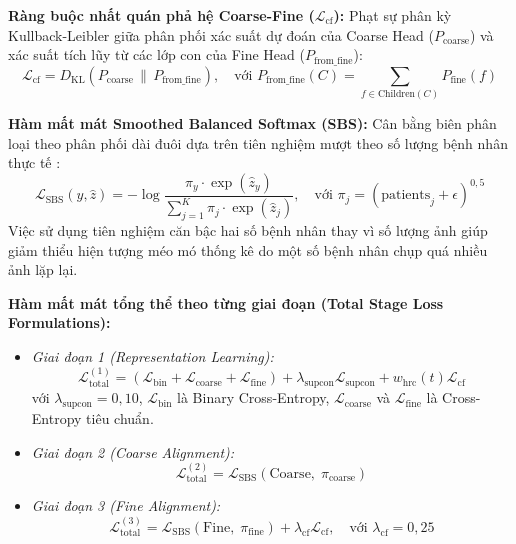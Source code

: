 \documentclass[runningheads]{llncs}
\begin{document}
\noindent \textbf{Ràng buộc nhất quán phả hệ Coarse-Fine ($\mathcal{L}_{\text{cf}}$):} Phạt sự phân kỳ Kullback-Leibler giữa phân phối xác suất dự đoán của Coarse Head ($P_{\text{coarse}}$) và xác suất tích lũy từ các lớp con của Fine Head ($P_{\text{from\_fine}}$):
\begin{equation}
\mathcal{L}_{\text{cf}} = D_{\text{KL}}\left(P_{\text{coarse}} \,\parallel\, P_{\text{from\_fine}}\right), \quad \text{với } P_{\text{from\_fine}}(C) = \sum_{f \in \text{Children}(C)} P_{\text{fine}}(f)
\end{equation}

\noindent \textbf{Hàm mất mát Smoothed Balanced Softmax (SBS):} Cân bằng biên phân loại theo phân phối dài đuôi dựa trên tiên nghiệm mượt theo số lượng bệnh nhân thực tế \cite{ref_ren2020balanced}:
\begin{equation}
\mathcal{L}_{\text{SBS}}(y, \hat{z}) = -\log \frac{\pi_y \cdot \exp(\hat{z}_y)}{\sum_{j=1}^{K} \pi_j \cdot \exp(\hat{z}_j)}, \quad \text{với } \pi_j = (\text{patients}_j + \epsilon)^{0{,}5}
\end{equation}
Việc sử dụng tiên nghiệm căn bậc hai số bệnh nhân thay vì số lượng ảnh giúp giảm thiểu hiện tượng méo mó thống kê do một số bệnh nhân chụp quá nhiều ảnh lặp lại.

\noindent \textbf{Hàm mất mát tổng thể theo từng giai đoạn (Total Stage Loss Formulations):}
\begin{itemize}
    \item \textit{Giai đoạn 1 (Representation Learning):}
    \begin{equation}
    \mathcal{L}_{\text{total}}^{(1)} = \left(\mathcal{L}_{\text{bin}} + \mathcal{L}_{\text{coarse}} + \mathcal{L}_{\text{fine}}\right) + \lambda_{\text{supcon}} \mathcal{L}_{\text{supcon}} + w_{\text{hrc}}(t) \mathcal{L}_{\text{cf}}
    \end{equation}
    với $\lambda_{\text{supcon}} = 0{,}10$, $\mathcal{L}_{\text{bin}}$ là Binary Cross-Entropy, $\mathcal{L}_{\text{coarse}}$ và $\mathcal{L}_{\text{fine}}$ là Cross-Entropy tiêu chuẩn.
    \item \textit{Giai đoạn 2 (Coarse Alignment):}
    \begin{equation}
    \mathcal{L}_{\text{total}}^{(2)} = \mathcal{L}_{\text{SBS}}\left(\text{Coarse}, \; \pi_{\text{coarse}}\right)
    \end{equation}
    \item \textit{Giai đoạn 3 (Fine Alignment):}
    \begin{equation}
    \mathcal{L}_{\text{total}}^{(3)} = \mathcal{L}_{\text{SBS}}\left(\text{Fine}, \; \pi_{\text{fine}}\right) + \lambda_{\text{cf}} \mathcal{L}_{\text{cf}}, \quad \text{với } \lambda_{\text{cf}} = 0{,}25
    \end{equation}
\end{itemize}
\end{document}
